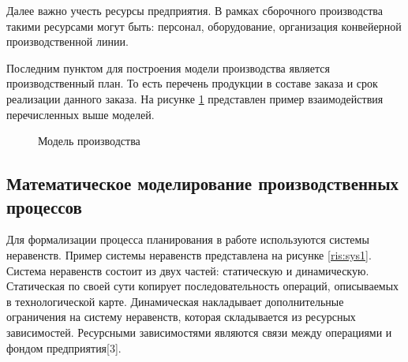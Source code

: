 Далее важно учесть ресурсы предприятия. В рамках сборочного производства такими ресурсами могут быть: персонал, оборудование, организация конвейерной производственной линии.

Последним пунктом для построения модели производства является производственный план. То есть перечень продукции в составе заказа и срок реализации данного заказа. На рисунке \ref{ris:Prod1} представлен пример взаимодействия перечисленных выше моделей. 

\begin{figure}[H]
    \caption{Модель производства}
    \label{ris:Prod1}
\end{figure}

\subsection{Математическое моделирование производственных процессов}

Для формализации процесса планирования в работе используются системы неравенств. Пример системы неравенств представлена на рисунке \ref{ris:sys1}. Система неравенств состоит из двух частей: статическую и динамическую. Статическая по своей сути копирует последовательность операций, описываемых в технологической карте. Динамическая накладывает дополнительные ограничения на систему неравенств, которая складывается из ресурсных зависимостей. Ресурсными зависимостями являются связи между операциями и фондом предприятия[3].

